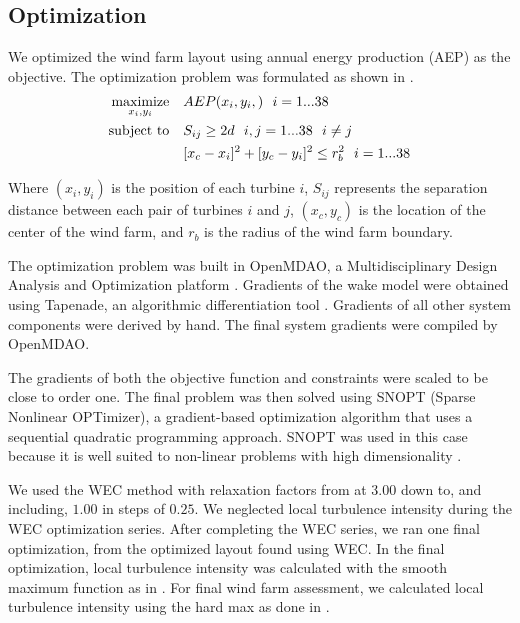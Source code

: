 \documentclass[conf]{new-aiaa}
\begin{document}
\subsection{Optimization}

We optimized the wind farm layout using annual energy production (AEP) as the objective. The optimization problem was formulated as shown in .
%
\begin{equation}
	\label{eq:objective}
	\begin{aligned} [b]
	\underset{x_i,y_i}{\textrm{maximize}} \quad & AEP(x_i,y_i,)~~i=1...38\\
	\textrm{subject to} \quad & S_{ij} \geq 2\*d~~i,j=1...38~~i \neq j\\
	 & [x_c-x_i]^2+[y_c-y_i]^2 \leq r_{b}^2~~i=1...38\\
	\end{aligned}
\end{equation}
%
Where $(x_i,y_i)$ is the position of each turbine $i$, $S_{ij}$ represents the separation distance between each pair of turbines $i$ and $j$, $(x_c,y_c)$ is the location of the center of the wind farm, and $r_b$ is the radius of the wind farm boundary.

The optimization problem was built in OpenMDAO, a Multidisciplinary Design Analysis and Optimization platform  \cite{gray2010_OpenMDAO}. Gradients of the wake model were obtained using Tapenade, an algorithmic differentiation tool \cite{tapenade2013}. Gradients of all other system components were derived by hand. The final system gradients were compiled by OpenMDAO.

The gradients of both the objective function and constraints were scaled to be close to order one. The final problem was then solved using SNOPT (Sparse Nonlinear OPTimizer), a gradient-based optimization algorithm that uses a sequential quadratic programming approach. SNOPT was used in this case because it is well suited to non-linear problems with high dimensionality \cite{gill2005}. 

We used the WEC method \cite{thomas2018-wec} with relaxation factors from at $3.00$ down to, and including, $1.00$ in steps of $0.25$. We neglected local turbulence intensity during the WEC optimization series. After completing the WEC series, we ran one final optimization, from the optimized layout found using WEC. In the final optimization, local turbulence intensity was calculated with the smooth maximum function as in . For final wind farm assessment, we calculated local turbulence intensity using the hard max as done in \cite{niayifar2016}.
\end{document}
